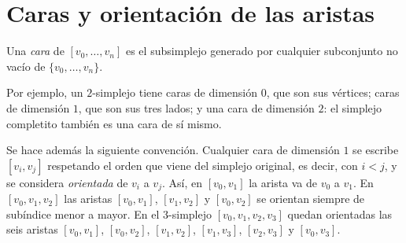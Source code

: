 \documentclass[11pt]{article}
\begin{document}
\section*{Caras y orientación de las aristas}

\begin{defn}[Cara]\label{defn:cara}
Una \emph{cara} de $[v_0,\dots,v_n]$ es el subsimplejo generado por cualquier subconjunto no vacío de $\{v_0,\dots,v_n\}$.
\end{defn}

Por ejemplo, un $2$-simplejo tiene caras de dimensión $0$, que son sus vértices; caras de dimensión $1$, que son sus tres lados; y una cara de dimensión $2$: el simplejo completito también es una cara de sí mismo.

Se hace además la siguiente convención. Cualquier cara de dimensión $1$ se escribe $[v_i,v_j]$ respetando el orden que viene del simplejo original, es decir, con $i<j$, y se considera \emph{orientada} de $v_i$ a $v_j$. Así, en $[v_0,v_1]$ la arista va de $v_0$ a $v_1$. En $[v_0,v_1,v_2]$ las aristas $[v_0,v_1]$, $[v_1,v_2]$ y $[v_0,v_2]$ se orientan siempre de subíndice menor a mayor. En el $3$-simplejo $[v_0,v_1,v_2,v_3]$ quedan orientadas las seis aristas $[v_0,v_1]$, $[v_0,v_2]$, $[v_1,v_2]$, $[v_1,v_3]$, $[v_2,v_3]$ y $[v_0,v_3]$.
\end{document}

